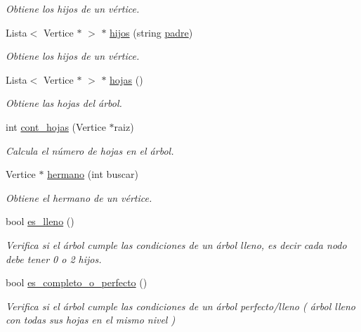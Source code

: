 \begin{DoxyCompactItemize}
\begin{DoxyCompactList}\small\item\em Obtiene los hijos de un vértice. \end{DoxyCompactList}\item 
Lista$<$ Vertice $\ast$ $>$ $\ast$ \hyperlink{classArbol_ac799e737e25e07d285d2bb29ba950b5c}{hijos} (string \hyperlink{classArbol_abcb8c26e9021a1418de71ad6014351cf}{padre})
\begin{DoxyCompactList}\small\item\em Obtiene los hijos de un vértice. \end{DoxyCompactList}\item 
Lista$<$ Vertice $\ast$ $>$ $\ast$ \hyperlink{classArbol_a54203315682d5c39015ae7d871223b66}{hojas} ()
\begin{DoxyCompactList}\small\item\em Obtiene las hojas del árbol. \end{DoxyCompactList}\item 
int \hyperlink{classArbol_aba59969b2a10294fb79e583a8e9471c5}{cont\+\_\+hojas} (Vertice $\ast$raiz)
\begin{DoxyCompactList}\small\item\em Calcula el número de hojas en el árbol. \end{DoxyCompactList}\item 
Vertice $\ast$ \hyperlink{classArbol_a59ae16f1a68c5e5afd08be20dcbf5717}{hermano} (int buscar)
\begin{DoxyCompactList}\small\item\em Obtiene el hermano de un vértice. \end{DoxyCompactList}\item 
bool \hyperlink{classArbol_a14ccdbb79a82bf19a24449acaea6c413}{es\+\_\+lleno} ()
\begin{DoxyCompactList}\small\item\em Verifica si el árbol cumple las condiciones de un árbol lleno, es decir cada nodo debe tener 0 o 2 hijos. \end{DoxyCompactList}\item 
bool \hyperlink{classArbol_a9e472df85f3bb1aa5c90f8157ad6ff22}{es\+\_\+completo\+\_\+o\+\_\+perfecto} ()
\begin{DoxyCompactList}\small\item\em Verifica si el árbol cumple las condiciones de un árbol perfecto/lleno ( árbol lleno con todas sus hojas en el mismo nivel ) \end{DoxyCompactList}\item 

\end{DoxyCompactItemize}
